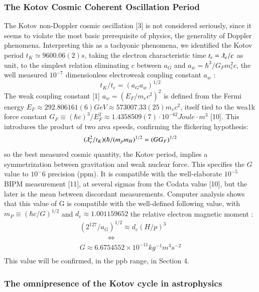 \documentclass[twoside,draft]{article}
\begin{document}
\begin{sloppypar}
{\subsubsection{The Kotov Cosmic Coherent Oscillation Period}

The Kotov non-Doppler cosmic oscillation [3] is not considered seriously, since it seems to
violate the most basic prerequisite of physics, the generality of Doppler phenomena. Interpreting
this as a tachyonic phenomena, we identified the Kotov period $t_{K} \simeq 9600.06(2) s$, taking the electron
characteristic time $t_{e} = \lambdabar_{e} /c$ as unit, to the simplest relation eliminating $c$ between $a_{G}$ and $a_{w}=
\hbar^{3} /G_{F} m_{e}^{2} c$, the well measured $10^{-7}$ dimensionless electroweak coupling constant $a_{w}$ :
\begin{equation}
t_{K} / t_{e} = (a_{G} a_{w})^{1/2}
\end{equation}
The weak coupling constant [1] $a_{w} = (E_{F} /m_{e} c^{2} )^{2}$ is defined from the Fermi energy 
$
E_{F} \approx 292.806161(6) GeV \approx 573007.33(25) m_{e} c^{2}
$, itself tied to the wea1k force constant 
$
G_{F} \equiv (\hbar c)^{3} /E_{F}^{2} \approx
1.4358509(7) \cdot 10^{-62} Joule \cdot m^{3}
$
[10]. This introduces the product of two area speeds, confirming the
flickering hypothesis:
\begin{equation}
(\lambdabar_{e}^2/t_{K} )(\hbar/(m_{p} m_{H})^{1/2} = (GG_{F})^{1/2}
\end{equation}
so the best measured cosmic quantity, the Kotov period, implies a symmetrization between
gravitation and weak nuclear force. This specifies the $G$ value to $10^-{6}$ precision (ppm). It is
compatible with the well-elaborate $10^{-5}$ BIPM measurement [11], at several sigmas from the Codata
value [10], but the later is the mean between discordant measurements.
Computer analysis shows that this value of G is compatible with the well-defined following
value, with $m_{P} \equiv (\hbar c/G)^{1/2}$ and $d_{e} \approx 1.001159652$ the relative electron magnetic moment :
$$\begin{array}{ll}
(2^{127} /a_{G} )^{1/2} \approx d_{e} (H/p)^{3} \\
\qquad  \qquad \Leftrightarrow \\
G \approx 6.6754552 \times 10^{-11} kg^{-1} m^{3} s^{-2} \\
\end{array}$$
This value will be confirmed, in the ppb range, in Section 4.

\subsubsection{The omnipresence of the Kotov cycle in astrophysics}

}
\end{sloppypar}
\end{document}
